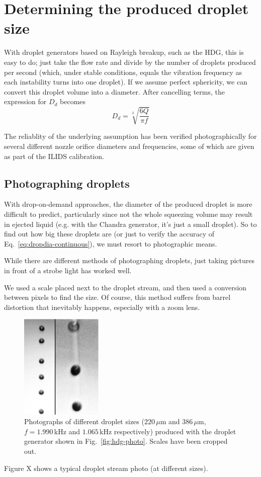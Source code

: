 \documentclass[11.5pt,oneside]{book}
\newcommand*{\figref}[1]{Fig.~\ref{#1}}
\begin{document}

\section{Determining the produced droplet size}
With droplet generators based on Rayleigh breakup, such as the HDG, this is easy
to do; just take the flow rate and divide by the number of droplets produced per
second (which, under stable conditions, equals the vibration frequency as each
instability turns into one droplet). If we assume perfect sphericity, we can
convert this droplet volume into a diameter. After cancelling terms, the
expression for $D_d$ becomes
\begin{equation}
    D_{d} = \sqrt[3]{\frac{6Q}{\pi f}}\label{eq:dropdia-continuous}
\end{equation}

The reliablity of the underlying assumption has been verified photographically
for several different nozzle orifice diameters and frequencies, some of which
are given as part of the ILIDS calibration.

\subsection{Photographing droplets}
With drop-on-demand approaches, the diameter of the produced droplet is more
difficult to predict, particularly since not the whole squeezing volume may
result in ejected liquid (e.g. with the Chandra generator, it's just a small
droplet). So to find out how big these droplets are (or just to verify the accuracy of
Eq.~\eqref{eq:dropdia-continuous}), we must resort to photographic means.

While there are different methods of photographing droplets, just taking
pictures in front of a strobe light has worked well.

We used a scale placed next to the droplet stream, and then used a conversion
between pixels to find the size. Of course, this method suffers from barrel
distortion that inevitably happens, especially with a zoom lens. 
\begin{figure}
\centering
\includegraphics[width=0.35\textwidth]{papers/hdg_images/photo.eps}
\caption{Photographs of different droplet sizes ($220\,\mu$m and $386\,\mu$m,
    $f=1.990\,$kHz and $1.065\,$kHz respectively) produced with the droplet
generator shown in \figref{fig:hdg-photo}. Scales have been cropped out.
\label{fig:hdg-dropphoto}}
\end{figure}
Figure X shows a typical droplet stream photo (at different sizes).
\end{document}
